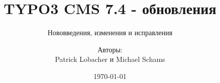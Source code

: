 %

%
%

\documentclass[t]{beamer}

\beamertemplatenavigationsymbolsempty

{
	\usetheme{typo3slides}
}

\title{TYPO3 CMS 7.4 - обновления}
\subtitle{Нововведения, изменения и исправления}
\author{
	\centerline{Авторы:}
	\centerline{Patrick Lobacher и Michael Schams}
}

\date{\today}



\sharefont


\begingroup
	[default]
	\begin{frame}
		\titlepage
	\end{frame}
\endgroup


\section*{TYPO3 CMS 7.3 - обновления}
\begin{frame}[fragile]
	\frametitle{Обзор глав}
	\framesubtitle{Обзор глав}

	\tableofcontents

\end{frame}

